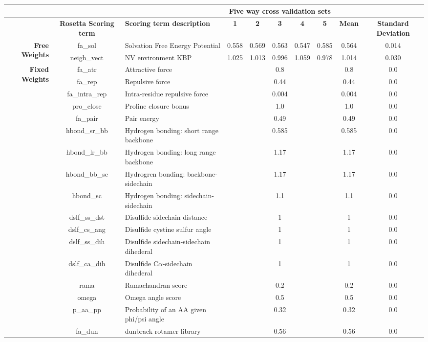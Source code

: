 
\begin{tabularx}{\textwidth}{|r||c|X|c|c|c|c|c|c|c|}
\hline
& & & \multicolumn{5}{c|}{\textbf{Five way cross validation sets}} & &  \\
\hline
& \textbf{Rosetta Scoring term} & \textbf{Scoring term description} & \textbf{1} & \textbf{2} & \textbf{3} & \textbf{4} & \textbf{5} & \textbf{Mean} & \textbf{Standard Deviation} \\
\hline
\hline
\multirow{2}{*}{\textbf{Free Weights}} & fa\_sol & Solvation Free Energy Potential & 0.558 & 0.569 & 0.563 & 0.547 & 0.585 & 0.564 & 0.014 \\
\cline{2-10}
& neigh\_vect & NV environment KBP & 1.025 & 1.013 & 0.996 & 1.059 & 0.978 & 1.014 & 0.030 \\
\hline
\multirow{17}{*}{\textbf{Fixed Weights}} & fa\_atr & Attractive force & \multicolumn{5}{c|}{0.8} & 0.8 & 0.0\\
\cline{2-10}
& fa\_rep & Repulsive force & \multicolumn{5}{c|}{0.44} & 0.44 & 0.0\\
\cline{2-10}
& fa\_intra\_rep & Intra-residue repulsive force & \multicolumn{5}{c|}{0.004} & 0.004 & 0.0\\
\cline{2-10}
& pro\_close & Proline closure bonus & \multicolumn{5}{c|}{1.0} & 1.0 & 0.0\\
\cline{2-10}
& fa\_pair & Pair energy & \multicolumn{5}{c|}{0.49} & 0.49 & 0.0\\
\cline{2-10}
& hbond\_sr\_bb & Hydrogen bonding: short range backbone & \multicolumn{5}{c|}{0.585} & 0.585 & 0.0\\
\cline{2-10}
& hbond\_lr\_bb & Hydrogen bonding: long range backbone & \multicolumn{5}{c|}{1.17} & 1.17 & 0.0\\
\cline{2-10}
& hbond\_bb\_sc & Hydrogren bonding: backbone-sidechain & \multicolumn{5}{c|}{1.17} & 1.17 & 0.0\\
\cline{2-10}
& hbond\_sc & Hydrogen bonding: sidechain-sidechain & \multicolumn{5}{c|}{1.1} & 1.1 & 0.0 \\
\cline{2-10}
& dslf\_ss\_dst & Disulfide sidechain distance & \multicolumn{5}{c|}{1} & 1 & 0.0\\
\cline{2-10}
& dslf\_cs\_ang & Disulfide cystine sulfur angle & \multicolumn{5}{c|}{1} & 1 & 0.0\\
\cline{2-10}
& dslf\_ss\_dih & Disulfide sidechain-sidechain dihederal & \multicolumn{5}{c|}{1} & 1 & 0.0\\
\cline{2-10}
& dslf\_ca\_dih & Disulfide C$\alpha$-sidechain dihederal & \multicolumn{5}{c|}{1} & 1 & 0.0\\
\cline{2-10}
& rama & Ramachandran score & \multicolumn{5}{c|}{0.2} & 0.2 & 0.0\\
\cline{2-10}
& omega & Omega angle score & \multicolumn{5}{c|}{0.5} & 0.5 & 0.0\\
\cline{2-10}
& p\_aa\_pp & Probability of an AA given phi/psi angle & \multicolumn{5}{c|}{0.32} & 0.32 & 0.0 \\
\cline{2-10}
& fa\_dun & dunbrack rotamer library & \multicolumn{5}{c|}{0.56} & 0.56 & 0.0\\
\hline
\end{tabularx}